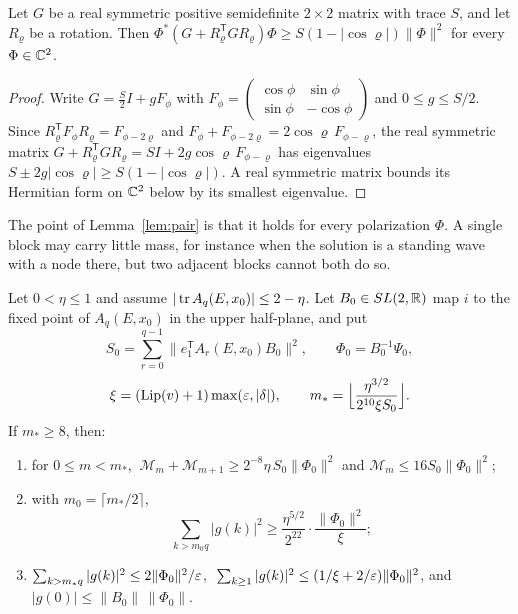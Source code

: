 \begin{lemma}\label{lem:pair}
Let $G$ be a real symmetric positive semidefinite $2\times2$ matrix with trace $S$, and let $R_\varrho$ be a rotation. Then $\Phi^*(G+R_\varrho^{\mathsf T}GR_\varrho)\Phi\ge S(1-|\cos\varrho|)\|\Phi\|^2$ for every $\Phi\in\mathbb C^2$.
\end{lemma}

\begin{proof}
Write $G=\frac S2I+gF_\phi$ with $F_\phi=\begin{pmatrix}\cos\phi&\sin\phi\\\sin\phi&-\cos\phi\end{pmatrix}$ and $0\le g\le S/2$. Since $R_\varrho^{\mathsf T}F_\phi R_\varrho=F_{\phi-2\varrho}$ and $F_\phi+F_{\phi-2\varrho}=2\cos\varrho\,F_{\phi-\varrho}$, the real symmetric matrix $G+R_\varrho^{\mathsf T}GR_\varrho=SI+2g\cos\varrho\,F_{\phi-\varrho}$ has eigenvalues $S\pm2g|\cos\varrho|\ge S(1-|\cos\varrho|)$. A real symmetric matrix bounds its Hermitian form on $\mathbb C^2$ below by its smallest eigenvalue.
\end{proof}

The point of Lemma~\ref{lem:pair} is that it holds for every polarization $\Phi$. A single block may carry little mass, for instance when the solution is a standing wave with a node there, but two adjacent blocks cannot both do so.

\begin{lemma}\label{lem:run}
Let $0<\eta\le1$ and assume $|\operatorname{tr} A_q(E,x_0)|\le2-\eta$. Let $B_0\in SL(2,\mathbb R)$ map $i$ to the fixed point of $A_q(E,x_0)$ in the upper half-plane, and put
\[
S_0=\sum_{r=0}^{q-1}\|e_1^{\mathsf T}A_r(E,x_0)B_0\|^2,\qquad\Phi_0=B_0^{-1}\Psi_0,
\]
\[
\xi=(\mathrm{Lip}(v)+1)\max(\varepsilon,|\delta|),\qquad m_*=\Bigl\lfloor\frac{\eta^{3/2}}{2^{10}\xi S_0}\Bigr\rfloor .
\]
If $m_*\ge8$, then:
\begin{enumerate}
\item for $0\le m<m_*$, $\ \mathcal M_m+\mathcal M_{m+1}\ge2^{-8}\eta\,S_0\|\Phi_0\|^2$ and $\mathcal M_m\le16S_0\|\Phi_0\|^2$;
\item with $m_0=\lceil m_*/2\rceil$,
\[
\sum_{k>m_0q}|g(k)|^2\ge\frac{\eta^{5/2}}{2^{22}}\cdot\frac{\|\Phi_0\|^2}{\xi};
\]
\item $\sum_{k>m_*q}|g(k)|^2\le2\|\Phi_0\|^2/\varepsilon$, $\ \sum_{k\ge1}|g(k)|^2\le(1/\xi+2/\eps)\|\Phi_0\|^2$, and $|g(0)|\le\|B_0\|\,\|\Phi_0\|$.
\end{enumerate}
\end{lemma}

